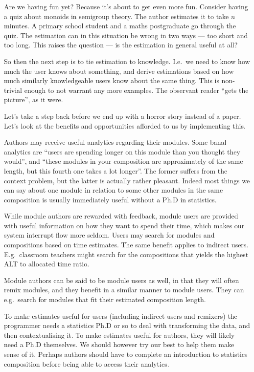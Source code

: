 \documentclass{article}
\begin{document}
\begin{multicols}{2}
Are we having fun yet? Because it's about to get even more fun. Consider 
having a quiz about monoids in semigroup theory. The author estimates it to 
take $n$ minutes. A primary school student and a maths postgraduate go through 
the quiz. The estimation can in this situation be wrong in two ways --- too 
short and too long. This raises the question --- is the estimation in general 
useful at all?

So then the next step is to tie estimation to knowledge. I.e.\ we need to know 
how much the user knows about something, and derive estimations based on how 
much similarly knowledgeable users know about the same thing. This is 
non-trivial enough to not warrant any more examples. The observant reader 
``gets the picture'', as it were.

Let's take a step back before we end up with a horror story instead of a 
paper. Let's look at the benefits and opportunities afforded to us by 
implementing this.

Authors may receive useful analytics regarding their modules. Some banal 
analytics are ``users are spending longer on this module than you thought they 
would'', and ``these modules in your composition are approximately of the same 
length, but this fourth one takes a lot longer''. The former suffers from the 
context problem, but the latter is actually rather pleasant. Indeed most 
things we can say about one module in relation to some other modules in the 
same composition is usually immediately useful without a Ph.D in statistics.

While module authors are rewarded with feedback, module users are provided 
with useful information on how they want to spend their time, which makes our 
system interrupt flow more seldom. Users may search for modules and 
compositions based on time estimates. The same benefit applies to indirect 
users. E.g.\ classroom teachers might search for the compositions that yields 
the highest ALT to allocated time ratio.

Module authors can be said to be module users as well, in that they will often 
remix modules, and they benefit in a similar manner to module users. They can 
e.g.\ search for modules that fit their estimated composition length.

To make estimates useful for users (including indirect users and remixers) the 
programmer needs a statistics Ph.D or so to deal with transforming the data, 
and then contextualising it. To make estimates useful for authors, they will 
likely need a Ph.D themselves. We should however try our best to help them 
make sense of it. Perhaps authors should have to complete an introduction to 
statistics composition before being able to access their analytics.

\end{multicols}
\end{document}

